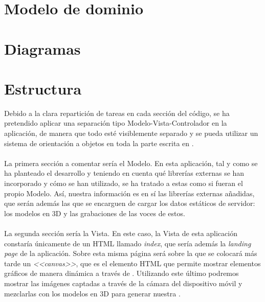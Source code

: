 \documentclass{subfiles}
\begin{document}

        \section{Modelo de dominio}
        \label{sec:modelo_de_dominio}

        \section{Diagramas}
        \label{sec:diagramas}

        \section{Estructura}
        \label{sec:estructura}
        Debido a la clara repartición de tareas en cada sección del código, se ha pretendido aplicar una separación tipo Modelo-Vista-Controlador en la aplicación, de manera que todo esté visiblemente separado y se pueda utilizar un sistema de orientación a objetos en toda la parte escrita en \js.

        \paragraph{}
        La primera sección a comentar sería el Modelo. En esta aplicación, tal y como se ha planteado el desarrollo y teniendo en cuenta qué librerías externas se han incorporado y cómo se han utilizado, se ha tratado a estas como si fueran el propio Modelo. Así, nuestra información es en sí las librerías externas añadidas, que serán además las que se encarguen de cargar los datos estáticos de servidor: los modelos en 3D y las grabaciones de las voces de estos.

        \paragraph{}
        La segunda sección sería la Vista. En este caso, la Vista de esta aplicación constaría únicamente de un HTML llamado \textit{index}, que sería además la \textit{landing page} de la aplicación. Sobre esta misma página será sobre la que se colocará más tarde un \textit{<<canvas>>}, que es el elemento HTML que permite mostrar elementos gráficos de manera dinámica a través de \js. Utilizando este último podremos mostrar las imágenes captadas a través de la cámara del dispositivo móvil y mezclarlas con los modelos en 3D para generar nuestra \ra.
\end{document}
